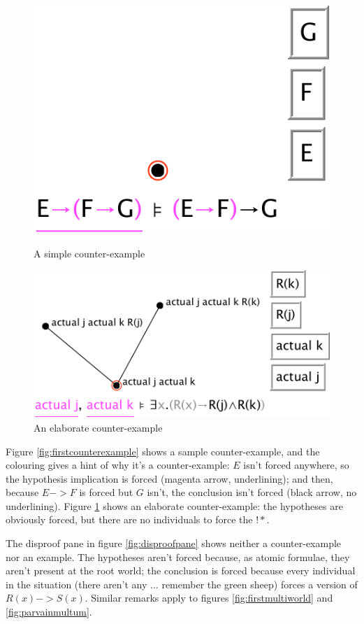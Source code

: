 \documentclass[11pt]{book}
\newcommand{\figref}[1]{figure \ref{fig:#1}}
\newcommand{\Figref}[1]{Figure \ref{fig:#1}}
\begin{document}
\begin{figure}
\centering
\parbox{150pt}{\centering
\includegraphics[scale=0.5]{pics/firstcounterexample}
\caption{A simple counter-example}
\label{fig:firstcounterexample}
}
\qquad
\parbox{250pt}{\centering
\includegraphics[scale=0.5]{pics/elaboratecounterexample}
\caption{An elaborate counter-example}
\label{fig:elaboratecounterexample}
}
\end{figure}

\Figref{firstcounterexample} shows a sample counter-example, and the colouring gives a hint of why it's a counter-example: $E$ isn't forced anywhere, so the hypothesis implication is forced (magenta arrow, underlining); and then, because $E->F$ is forced but $G$ isn't, the conclusion isn't forced (black arrow, no underlining). \Figref{elaboratecounterexample} shows an elaborate counter-example: the hypotheses are obviously forced, but there are no individuals to force the $!*$.

The disproof pane in \figref{disproofpane} shows neither a counter-example nor an example. The hypotheses aren't forced because, as atomic formulae, they aren't present at the root world; the conclusion is forced because every individual in the situation (there aren't any ... remember the green sheep) forces a version of $R(x)->S(x)$. Similar remarks apply to figures \ref{fig:firstmultiworld} and \ref{fig:parvainmultum}.
\end{document}

